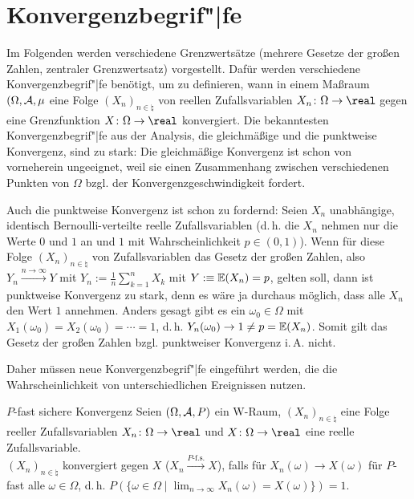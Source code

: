 \pagebreak

\section{%
    Konvergenzbegrif"|fe%
}

\begin{Bem}
    Im Folgenden werden verschiedene Grenzwertsätze
    (mehrere Gesetze der großen Zahlen, zentraler Grenzwertsatz) vorgestellt.
    Dafür werden verschiedene Konvergenzbegrif"|fe benötigt,
    um zu definieren, wann in einem Maßraum $(\Omega, \mathcal{A}, \mu$ eine Folge
    $(X_n)_{n \in \natural}$ von reellen Zufallsvariablen $X_n\colon \Omega \rightarrow \real$
    gegen eine Grenzfunktion $X\colon \Omega \rightarrow \real$ konvergiert.
    Die bekanntesten Konvergenzbegrif"|fe aus der
    Analysis, die gleichmäßige und die punktweise Konvergenz, sind zu stark:
    Die gleichmäßige Konvergenz ist schon von vorneherein ungeeignet, weil sie einen Zusammenhang
    zwischen verschiedenen Punkten von $\Omega$ bzgl. der Konvergenzgeschwindigkeit fordert.

    Auch die punktweise Konvergenz ist schon zu fordernd:
    Seien $X_n$ unabhängige, identisch Ber\-noulli-verteilte reelle Zufallsvariablen
    (d.\,h. die $X_n$ nehmen nur die Werte $0$ und $1$ an und $1$ mit Wahrscheinlichkeit
    $p \in (0, 1)$).
    Wenn für diese Folge $(X_n)_{n \in \natural}$ von Zufallsvariablen das Gesetz der großen
    Zahlen, also $Y_n \xrightarrow{n \to \infty} Y$ mit $Y_n := \frac{1}{n} \sum_{k=1}^n X_k$ mit
    $Y :\equiv \mathbb{E}(X_n) = p$, gelten soll, dann ist punktweise Konvergenz zu stark,
    denn es wäre ja durchaus möglich, dass alle $X_n$ den Wert $1$ annehmen.
    Anders gesagt gibt es ein $\omega_0 \in \Omega$ mit
    $X_1(\omega_0) = X_2(\omega_0) = \dotsb = 1$, d.\,h. $Y_n(\omega_0) \to 1 \not= p = \mathbb{E}(X_n)$.
    Somit gilt das Gesetz der großen Zahlen bzgl. punktweiser Konvergenz i.\,A. nicht.

    Daher müssen neue Konvergenzbegrif"|fe eingeführt werden, die die
    Wahrscheinlichkeit von unterschiedlichen Ereignissen nutzen.
\end{Bem}

\linie

\begin{Def}{$P$-fast sichere Konvergenz}
    Seien $(\Omega, \mathcal{A}, P)$ ein W-Raum,
    $(X_n)_{n \in \natural}$ eine Folge reeller Zufallsvariablen
    $X_n\colon \Omega \rightarrow \real$ und
    $X\colon \Omega \rightarrow \real$ eine reelle Zufallsvariable.\\
    $(X_n)_{n \in \natural}$ konvergiert  gegen $X$
    ($X_n \xrightarrow{P\text{-f.s.}} X$), falls
    für $X_n(\omega) \to X(\omega)$ für $P$-fast alle $\omega \in \Omega$,
    d.\,h. $P(\{\omega \in \Omega \;|\; \lim_{n \to \infty} X_n(\omega) = X(\omega)\}) = 1$.
\end{Def}

